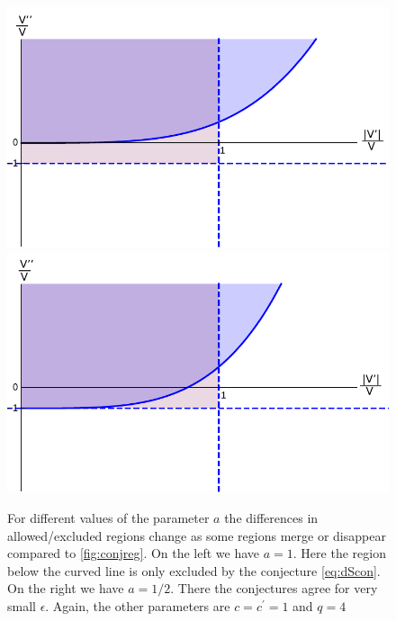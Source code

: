 \documentclass[a4paper,12pt,twoside,openright]{report}
\begin{document}
\begin{figure}[htp]
     \centering
     \includegraphics[scale=0.6]{conreg1_mod.pdf}
     \includegraphics[scale=0.6]{conreg2_mod.pdf}
     \caption{For different values of the parameter $a$ the differences in allowed/excluded regions change as some regions merge or disappear compared to \ref{fig:conjreg}. On the left we have $a = 1$. Here the region below the curved line is only excluded by the conjecture \eqref{eq:dScon}. On the right we have $a=1/2$. There the conjectures agree for very small $\epsilon$. Again, the other parameters are $c=c^ \prime = 1$ and $q=4$}
     \label{fig:conjreg2}
\end{figure}
\end{document}
